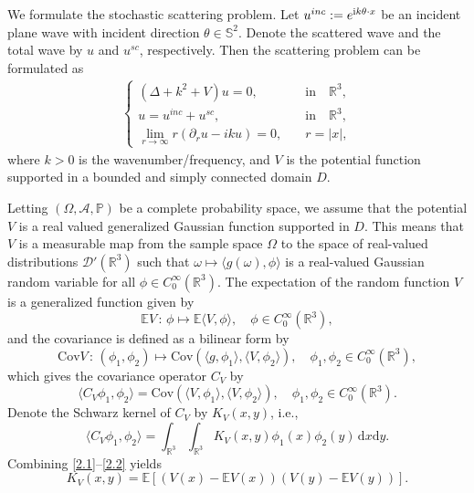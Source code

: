 \documentclass[reqno, 12pt]{amsart}
\numberwithin{equation}{section}
\begin{document}
We formulate the stochastic scattering problem. Let $u^{inc}:=e^{{\rm i}k\theta \cdot x}$  be an incident plane wave with incident direction $\theta \in \mathbb{S}^2$. Denote the scattered wave and the total wave by $u$ and $u^{sc}$, respectively. Then the scattering problem can be formulated as \begin{align}\label{DSP}
	\begin{cases}
		(\Delta+k^2+V)u=0 ,& \quad \text{in}\quad \mathbb{R}^3,  \\
		u=u^{inc}+u^{sc}, & \quad \text{in}\quad \mathbb{R}^3,\\
		\lim\limits_{r \to \infty} r (\partial_r u- ik u)=0, &\quad r=|x|,
	\end{cases} 
\end{align}
where $k>0$ is the wavenumber\slash frequency, and $V$ is the potential function supported in a bounded and simply connected domain $D$.

Letting $(\Omega, \mathcal{A}, \mathbb{P})$ be a complete probability space,
we assume that the potential $V$ is a real valued generalized Gaussian function supported in $D$. This means that $V$ is a measurable map from the
sample space $\Omega$ to the space of real-valued distributions $\mathcal D'(\mathbb R^3)$ such that $\omega \mapsto \langle g(\omega), \phi \rangle$ is a real-valued Gaussian random variable for all $\phi \in C_0^\infty(\mathbb R^3)$. The expectation of the random function $V$ is a generalized function given by \[
\mathbb{E}V\, :\, \phi \mapsto \mathbb{E}\langle V,\phi \rangle, \quad \phi \in C_0^\infty(\mathbb R^3),
\] and the covariance is defined as a bilinear form by \[
\mathrm{Cov}V\,:\, (\phi_1, \phi_2) \mapsto \mathrm{Cov}(\langle g,\phi_1 \rangle, \langle V,\phi_2 \rangle), \quad \phi_1, \phi_2 \in C_0^\infty(\mathbb R^3),
\] which gives the covariance operator $C_V$ by \begin{equation}\label{2.1}
	\langle C_V \phi_1, \phi_2 \rangle = \mathrm{Cov}(\langle V,\phi_1 \rangle, \langle V,\phi_2 \rangle), \quad \phi_1, \phi_2 \in C_0^\infty(\mathbb R^3).
\end{equation} Denote the Schwarz kernel of $C_V$ by $K_V(x,y)$, i.e., \begin{equation}\label{2.2}
	\langle C_V \phi_1, \phi_2 \rangle=\int_{\mathbb{R}^3}\int_{\mathbb{R}^3} K_V(x,y) \phi_1(x)\phi_2(y) \,\mathrm{d}x\mathrm{d}y. \end{equation} Combining 
\eqref{2.1}--\eqref{2.2} yields \[
K_V(x,y)=\mathbb{E}[(V(x)-\mathbb{E}V(x))(V(y)-\mathbb{E}V(y))].
\]
\end{document}
